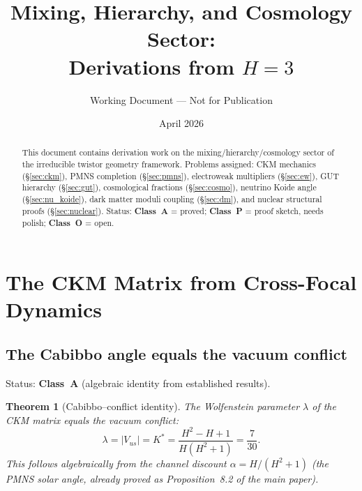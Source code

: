 \documentclass[11pt,a4paper]{article}
\title{Mixing, Hierarchy, and Cosmology Sector:\\Derivations from $H=3$}
\author{Working Document --- Not for Publication}
\date{April 2026}
\newtheorem{theorem}{Theorem}[section]
\theoremstyle{definition}
\theoremstyle{remark}
\begin{document}
\maketitle

\begin{abstract}
This document contains derivation work on the mixing/hierarchy/cosmology sector of the irreducible twistor geometry framework. Problems assigned: CKM mechanics (\S\ref{sec:ckm}), PMNS completion (\S\ref{sec:pmns}), electroweak multipliers (\S\ref{sec:ew}), GUT hierarchy (\S\ref{sec:gut}), cosmological fractions (\S\ref{sec:cosmo}), neutrino Koide angle (\S\ref{sec:nu_koide}), dark matter moduli coupling (\S\ref{sec:dm}), and nuclear structural proofs (\S\ref{sec:nuclear}). Status: \textbf{Class~A} = proved; \textbf{Class~P} = proof sketch, needs polish; \textbf{Class~O} = open.
\end{abstract}

\tableofcontents
\newpage


\section{The CKM Matrix from Cross-Focal Dynamics}\label{sec:ckm}

\subsection{The Cabibbo angle equals the vacuum conflict}\label{sec:cabibbo}

Status: \textbf{Class~A} (algebraic identity from established results).

\begin{theorem}[Cabibbo--conflict identity]\label{thm:cabibbo}
The Wolfenstein parameter $\lambda$ of the CKM matrix equals the vacuum conflict:
\begin{equation}\label{eq:cabibbo_identity}
\lambda = |V_{us}| = K^* = \frac{H^2-H+1}{H(H^2+1)} = \frac{7}{30}.
\end{equation}
This follows algebraically from the channel discount $\alpha = H/(H^2+1)$ (the PMNS solar angle, already proved as Proposition~8.2 of the main paper).
\end{theorem}
\end{document}
